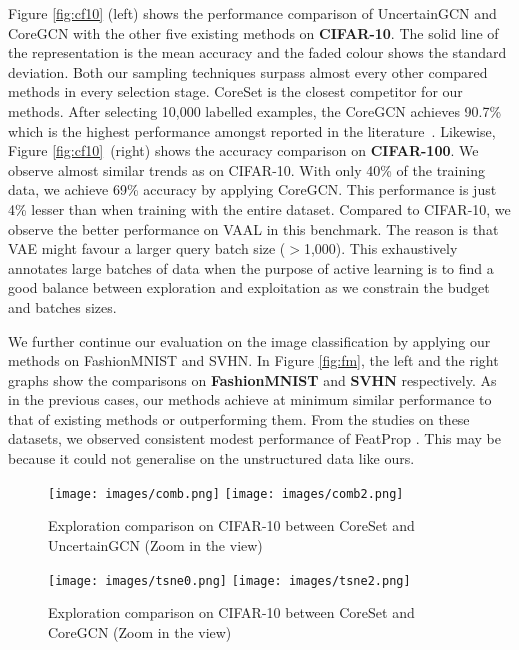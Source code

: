 Figure \ref{fig:cf10} (left) shows the performance comparison of UncertainGCN and CoreGCN 
with the other five existing methods on \textbf{CIFAR-10}. The solid line of the representation 
is the mean accuracy and the faded colour shows the
standard deviation. Both our sampling techniques surpass almost every other compared methods in every selection stage.
CoreSet is the closest competitor for our methods. After selecting 10,000 labelled examples, 
the CoreGCN achieves 90.7\% which is the highest performance amongst reported in the literature~\cite{Yoo2019LearningLearning,Sinha2019VariationalLearning}. 
Likewise, Figure \ref{fig:cf10}~(right) shows the accuracy comparison on \textbf{CIFAR-100}. 
We observe almost similar trends as on CIFAR-10.  
With only 40\% of the training data, we achieve 69\% accuracy by applying CoreGCN.
This performance is just 4\% lesser than when training with the entire dataset. 
Compared to CIFAR-10, we observe the better performance on VAAL 
in this benchmark.
The reason is that VAE might favour a larger query batch size ($>$1,000).
This exhaustively annotates large batches of data when the purpose of active learning 
is to find a good balance between exploration and exploitation as we constrain
the budget and batches sizes.


We further continue our evaluation on the image classification by applying our methods on 
FashionMNIST and SVHN. In Figure \ref{fig:fm}, the left and the right graphs show the comparisons on
\textbf{FashionMNIST} and \textbf{SVHN} respectively. As in the previous cases, our methods achieve at minimum 
similar performance to that of existing methods or outperforming them.
From the studies on these datasets, we observed consistent modest performance of FeatProp \cite{Wu2019ActivePropagation}.
This may be because it could not generalise on the unstructured 
data like ours.
\begin{figure}
    \centering
    \texttt{[image: images/comb.png]}
    \texttt{[image: images/comb2.png]}
\caption{Exploration comparison on CIFAR-10 between CoreSet and UncertainGCN (Zoom in the view)}
    \label{fig:tsne}
\end{figure}

\begin{figure}
    \centering
    \texttt{[image: images/tsne0.png]}
    \texttt{[image: images/tsne2.png]}
\caption{Exploration comparison on CIFAR-10 between CoreSet and CoreGCN (Zoom in the view)}
    \label{fig:tsne_compare_coreset}
\end{figure}

